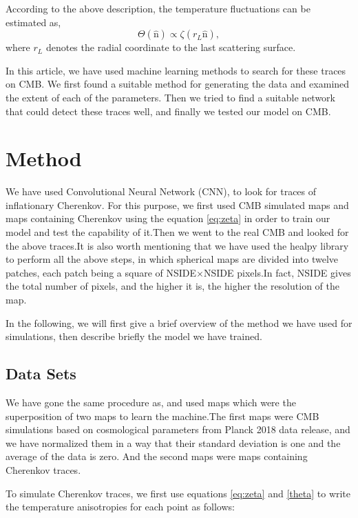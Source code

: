 \documentclass[10pt, english, pra,aps,twocolumn,floatfix,superscriptaddress]{revtex4-2}
\begin{document}
According to the above description, the temperature fluctuations can be estimated as,
\begin{equation}
\label{theta}
    \Theta(\hat{\mathrm{n}}) \propto \zeta\left(r_{L} \hat{\mathrm{n}}\right),
\end{equation}
 where $r_L$ denotes the radial coordinate to the last scattering surface.

In this article, we have used machine learning methods to search for these traces on CMB. We first found a suitable method for generating the data and examined the extent of each of the parameters. Then we tried to find a suitable network that could detect these traces well, and finally we tested our model on CMB.

\section{Method}
We have used Convolutional Neural Network (CNN), to look for traces of inflationary Cherenkov. For this purpose, we first used CMB simulated maps and maps containing Cherenkov using the equation \ref{eq:zeta} in order to train our model and test the capability of it.Then we went to the real CMB and looked for the above traces.It is also worth mentioning that we have used the healpy library to perform all the above steps, in which spherical maps are divided into twelve patches, each patch being a square of NSIDE$\times$NSIDE pixels\cite{Gorski_2005}.In fact, NSIDE gives the total number of pixels, and the higher it is, the higher the resolution of the map.

In the following, we will first give a brief overview of the method we have used for simulations, then describe briefly the model we have trained.
\subsection{Data Sets}
We have gone the same procedure as\cite{Vafaei_Sadr_2017}, and used maps which were the superposition of two maps to learn the machine.The first maps were CMB simulations based on cosmological parameters from Planck 2018 data release\cite{2018planck}, and we have normalized them in a way that their standard deviation is one and the average of the data is zero. And the second maps were maps containing Cherenkov traces.

To simulate Cherenkov traces, we first use equations \ref{eq:zeta} and \ref{theta} to write the temperature anisotropies for each point as follows:
\end{document}
